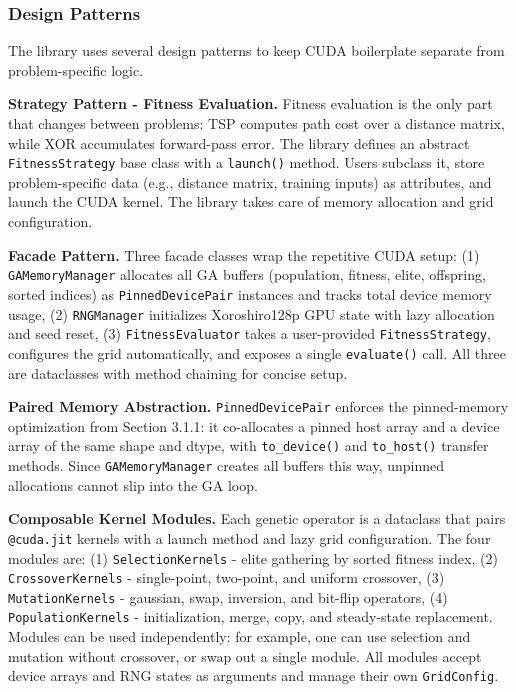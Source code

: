 \subsubsection*{Design Patterns}

The library uses several design patterns to keep CUDA boilerplate separate from problem-specific logic.

\textbf{Strategy Pattern - Fitness Evaluation.}
Fitness evaluation is the only part that changes between problems: TSP computes path cost over a distance matrix, while XOR accumulates forward-pass error. The library defines an abstract \texttt{FitnessStrategy} base class with a \texttt{launch()} method. Users subclass it, store problem-specific data (e.g., distance matrix, training inputs) as attributes, and launch the CUDA kernel. The library takes care of memory allocation and grid configuration.

\textbf{Facade Pattern.}
Three facade classes wrap the repetitive CUDA setup:
(1) \texttt{GAMemoryManager} allocates all GA buffers (population, fitness, elite, offspring, sorted indices) as \texttt{PinnedDevicePair} instances and tracks total device memory usage,
(2) \texttt{RNGManager} initializes Xoroshiro128p GPU state with lazy allocation and seed reset,
(3) \texttt{Fitness\-Evaluator} takes a user-provided \texttt{Fitness\-Strategy}, configures the grid automatically, and exposes a single \texttt{evaluate()} call.
All three are dataclasses with method chaining for concise setup.

\textbf{Paired Memory Abstraction.}
\texttt{PinnedDevicePair} enforces the pinned-memory optimization from Section 3.1.1: it co-allocates a pinned host array and a device array of the same shape and dtype, with \texttt{to\_device()} and \texttt{to\_host()} transfer methods. Since \texttt{GAMemoryManager} creates all buffers this way, unpinned allocations cannot slip into the GA loop.

\textbf{Composable Kernel Modules.}
Each genetic operator is a dataclass that pairs \texttt{@cuda.jit} kernels with a launch method and lazy grid configuration. The four modules are:
(1) \texttt{Selection\-Kernels} - elite gathering by sorted fitness index,
(2) \texttt{Crossover\-Kernels} - single-point, two-point, and uniform crossover,
(3) \texttt{Mutation\-Kernels} - gaussian, swap, inversion, and bit-flip operators,
(4) \texttt{Population\-Kernels} - initialization, merge, copy, and steady-state replacement.
Modules can be used independently: for example, one can use selection and mutation without crossover, or swap out a single module. All modules accept device arrays and RNG states as arguments and manage their own \texttt{GridConfig}.

